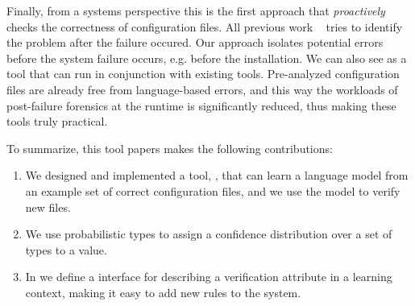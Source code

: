 Finally, from a systems perspective this is the first approach that {\emph{proactively}} checks 
 the correctness of configuration files. All previous work
~\cite{xu15systems,zhang14encore,yuan11context, wang04automatic,attariyan10automating,
su07autobash,whitaker04configuration} tries to identify the problem after the
failure occured. Our approach isolates potential errors before the system failure occurs, e.g. before the installation. We can also see \app as a tool that can run in conjunction with existing tools. Pre-analyzed configuration files are already free from language-based errors, and this way the workloads of post-failure forensics at the runtime
is significantly reduced, thus making these tools truly practical.

To summarize, this tool papers makes the following contributions:

\begin{enumerate}

  \item We designed and implemented a tool, \app, that can learn a language model from an example set of correct configuration files, and we use the model to verify new files.
  \item We use probabilistic types to assign a confidence distribution over a set of types to a value.
  \item In \app we define a interface for describing a verification attribute in a learning context, making it easy to add new rules to the system.

\end{enumerate}
